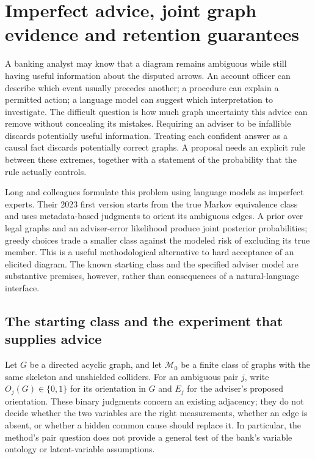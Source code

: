 \section{Imperfect advice, joint graph evidence and retention guarantees}
\label{exec17:advice-development}

A banking analyst may know that a diagram remains ambiguous while still
having useful information about the disputed arrows. An account officer can
describe which event usually precedes another; a procedure can explain a
permitted action; a language model can suggest which interpretation to
investigate. The difficult question is how much graph uncertainty this advice
can remove without concealing its mistakes. Requiring an adviser to be
infallible discards potentially useful information. Treating each confident
answer as a causal fact discards potentially correct graphs. A proposal needs
an explicit rule between these extremes, together with a statement of the
probability that the rule actually controls.

Long and colleagues formulate this problem using language models as imperfect
experts. Their 2023 first version starts from the true Markov equivalence class
and uses metadata-based judgments to orient its ambiguous edges. A prior over
legal graphs and an adviser-error likelihood produce joint posterior
probabilities; greedy choices trade a smaller class against the modeled risk
of excluding its true member. This is a useful methodological alternative to
hard acceptance of an elicited diagram. The known starting class and the
specified adviser model are substantive premises, however, rather than
consequences of a natural-language interface.\citep{exec17_imperfect_experts}

\subsection{The starting class and the experiment that supplies advice}

Let $G$ be a directed acyclic graph, and let $\mathcal M_0$ be a finite class of
graphs with the same skeleton and unshielded colliders. For an ambiguous pair
$j$, write $O_j(G)\in\{0,1\}$ for its orientation in $G$ and $E_j$ for the
adviser's proposed orientation. These binary judgments concern an existing
adjacency; they do not decide whether the two variables are the right
measurements, whether an edge is absent, or whether a hidden common cause
should replace it. In particular, the method's pair question does not provide
a general test of the bank's variable ontology or latent-variable assumptions.

